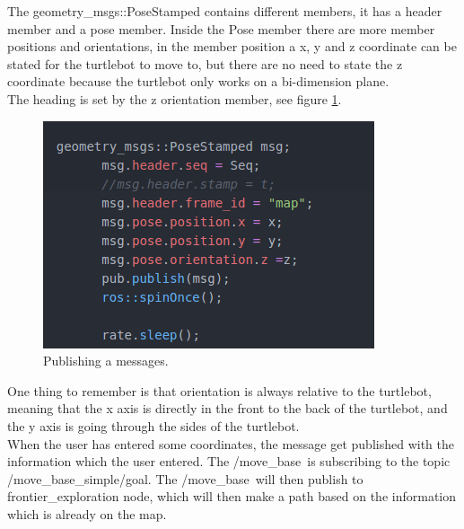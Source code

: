 The geometry\_msgs::PoseStamped contains different members, it has a header member and a pose member. Inside the Pose member there are more member positions and orientations, in the member position a x, y and z coordinate can be stated for the turtlebot to move to, but there are no need to state the z coordinate because the turtlebot only works on a bi-dimension plane.\\ 
The heading is set by the z orientation member, see figure \ref{fig:msg}.\\
\begin{figure}[h!]
    \centering
    \includegraphics[width=.5\textwidth]{figures/msgbyc.png}
    \caption{Publishing a messages.} 
    \label{fig:msg} 
\end{figure}
One thing to remember is that orientation is always relative to the turtlebot, meaning that the x axis is directly in the front to the back of the turtlebot, and the y axis is going through the sides of the turtlebot.\\
When the user has entered some coordinates, the message get published with the information which the user entered. The /move\_base\ is subscribing to the topic /move\_base\_simple/goal. The /move\_base\ will then publish to frontier\_exploration node, which will then make a path based on the information which is already on the map.
